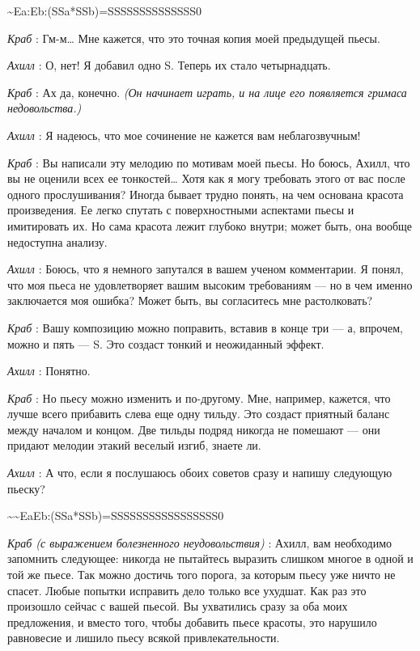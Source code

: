 \textasciitilde Ea:Eb:(SSa*SSb)=SSSSSSSSSSSSSS0

\emph{Краб} : Гм-м\ldots{} Мне кажется, что это точная копия моей предыдущей пьесы.

\emph{Ахилл} : О, нет! Я добавил одно S. Теперь их стало четырнадцать.

\emph{Краб} : Ах да, конечно. \emph{(Он начинает играть, и на лице его появляется гримаса недовольства.)}

\emph{Ахилл} : Я надеюсь, что мое сочинение не кажется вам неблагозвучным!

\emph{Краб} : Вы написали эту мелодию по мотивам моей пьесы. Но боюсь, Ахилл, что вы не оценили всех ее тонкостей\ldots{} Хотя как я могу требовать этого от вас после одного прослушивания? Иногда бывает трудно понять, на чем основана красота произведения. Ее легко спутать с поверхностными аспектами пьесы и имитировать их. Но сама красота лежит глубоко внутри; может быть, она вообще недоступна анализу.

\emph{Ахилл} : Боюсь, что я немного запутался в вашем ученом комментарии. Я понял, что моя пьеса не удовлетворяет вашим высоким требованиям --- но в чем именно заключается моя ошибка? Может быть, вы согласитесь мне растолковать?

\emph{Краб} : Вашу композицию можно поправить, вставив в конце три --- а, впрочем, можно и пять --- S. Это создаст тонкий и неожиданный эффект.

\emph{Ахилл} : Понятно.

\emph{Краб} : Но пьесу можно изменить и по-другому. Мне, например, кажется, что лучше всего прибавить слева еще одну тильду. Это создаст приятный баланс между началом и концом. Две тильды подряд никогда не помешают --- они придают мелодии этакий веселый изгиб, знаете ли.

\emph{Ахилл} : А что, если я послушаюсь обоих советов сразу и напишу следующую пьеску?

\textasciitilde\textasciitilde EaEb:(SSa*SSb)=SSSSSSSSSSSSSSSSS0

\emph{Краб (с выражением болезненного неудовольствия)} : Ахилл, вам необходимо запомнить следующее: никогда не пытайтесь выразить слишком многое в одной и той же пьесе. Так можно достичь того порога, за которым пьесу уже ничто не спасет. Любые попытки исправить дело только все ухудшат. Как раз это произошло сейчас с вашей пьесой. Вы ухватились сразу за оба моих предложения, и вместо того, чтобы добавить пьесе красоты, это нарушило равновесие и лишило пьесу всякой привлекательности.

